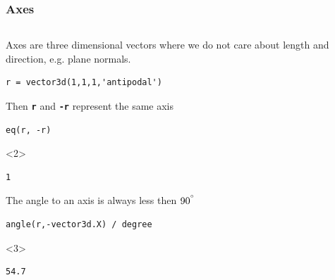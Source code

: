 \documentclass[compress]{beamer}
\begin{document}
\begin{frame}[fragile]
  \frametitle{Axes}

  \begin{columns}
    \begin{column}{8.5cm}
      \begin{overlayarea}{8.5cm}{8cm}
        Axes are three dimensional vectors where we do not care about length and
        direction, e.g. plane normals.

\begin{lstlisting}[style=input]
r = vector3d(1,1,1,'antipodal')
\end{lstlisting}

\medskip
\pause

Then \textbf{\texttt{r}} and \textbf{\texttt{-r}} represent the same axis
\begin{lstlisting}[style=input]
eq(r, -r)
\end{lstlisting}
\begin{onlyenv}<2>
  \vspace{-0.3cm}
\begin{lstlisting}[style=output]
  1
\end{lstlisting}
\end{onlyenv}

\medskip
\pause

The angle to an axis is always less then $90^{^\circ}$
\begin{lstlisting}[style=input]
angle(r,-vector3d.X) / degree
\end{lstlisting}
\begin{onlyenv}<3>
  \vspace{-0.3cm}
\begin{lstlisting}[style=output]
  54.7
\end{lstlisting}
\end{onlyenv}

\medskip
\pause


\end{overlayarea}
\end{column}
\end{columns}
\end{frame}
\end{document}
